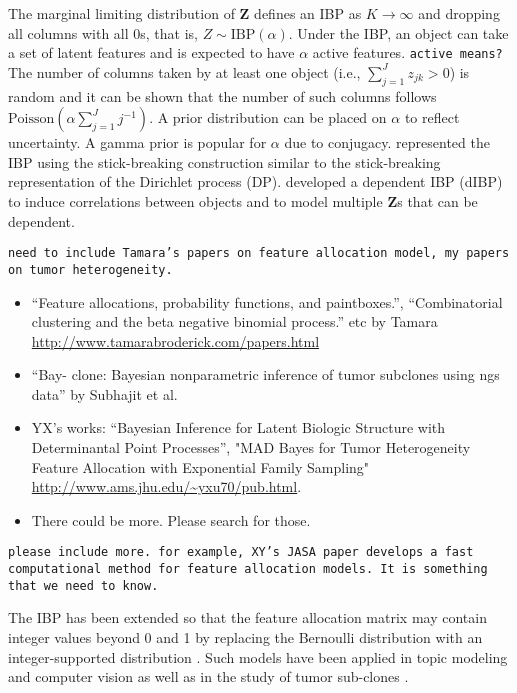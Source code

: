 \documentclass[12pt,]{article}
\def\Z{\bm{Z}}
\begin{document}
The marginal limiting distribution of $\Z$ defines an IBP as $K \rightarrow
\infty$ and dropping all columns with all 0s, that is,  \(Z \sim
\text{IBP}(\alpha)\). Under the IBP, an object can take a set of latent
features and is expected to have  \(\alpha\)
active features.
%
{\tt active means?}
%
The number of columns taken by at least one object (i.e., $\sum_{j=1}^J z_{jk} >0$) is random
and it can be shown that the number of such columns follows
\(\text{Poisson}(\alpha \sum_{j=1}^J j^{-1})\).   A prior distribution can be
placed on \(\alpha\) to reflect uncertainty. A gamma prior is popular for
$\alpha$ due to conjugacy.  \cite{teh2007stick} represented the IBP using the
stick-breaking construction similar to the stick-breaking representation of the
Dirichlet process (DP).  \cite{williamson2010dependent} developed a dependent
IBP (dIBP) to induce correlations between objects and to model multiple
$\Z$s that can be dependent.

{\tt need to include Tamara's papers on feature allocation model, my papers on
  tumor heterogeneity. 

\begin{itemize}
\item ``Feature allocations, probability functions, and paintboxes.'',
  ``Combinatorial clustering and the beta negative binomial process.'' etc by
  Tamara \url{http://www.tamarabroderick.com/papers.html}

\item ``Bay- clone: Bayesian nonparametric inference of tumor subclones using
  ngs data'' by Subhajit et al.
 
\item YX's works: ``Bayesian Inference for Latent Biologic Structure with
  Determinantal Point Processes'', "MAD Bayes for Tumor Heterogeneity Feature
  Allocation with Exponential Family Sampling"
  \url{http://www.ams.jhu.edu/~yxu70/pub.html}.

\item There could be more.  Please search for those.
\end{itemize}
}

{\tt please include more. for example, XY's JASA paper develops a fast
computational method for feature allocation models.  It is something that we
need to know.  }

The IBP has been extended so that the feature allocation matrix may contain
integer values beyond 0 and 1 by replacing the Bernoulli distribution with an
integer-supported distribution \citep{broderick2013feature}. Such models have
been applied in topic modeling and computer vision
\cite{broderick2015combinatorial} as well as in the study of tumor sub-clones
\citep{sengupta2014bayclone}.
\end{document}
